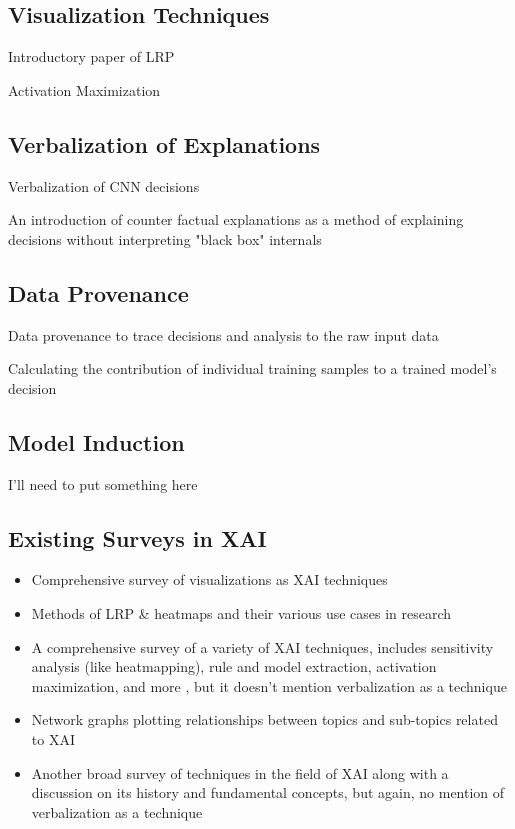 \documentclass{IEEEtran}
\begin{document}
\subsection{Visualization Techniques}

Introductory paper of LRP \cite{10.1371/journal.pone.0130140}

Activation Maximization \cite{Nguyen2016}

\subsection{Verbalization of Explanations}
Verbalization of CNN decisions \cite{10.1007/978-3-319-46493-0_1}

An introduction of counter factual explanations as a method of explaining decisions without interpreting "black box" internals \cite{DBLP:journals/corr/abs-1711-00399}

\subsection{Data Provenance}

Data provenance to trace decisions and analysis to the raw input data

Calculating the contribution of individual training samples to a trained model's decision \cite{Ma2017}

\subsection{Model Induction}

I'll need to put something here

\subsection{Existing Surveys in XAI}

\begin{itemize}
    \item Comprehensive survey of visualizations as XAI techniques \cite{Hohman2018}
    \item Methods of LRP \& heatmaps and their various use cases in research\cite{MONTAVON20181}
    \item A comprehensive survey of a variety of XAI techniques, includes sensitivity analysis (like heatmapping), rule and model extraction, activation maximization, and more \cite{Guidotti:2018:SME:3271482.3236009}, but it doesn't mention verbalization as a technique
    \item Network graphs plotting relationships between topics and sub-topics related to XAI \cite{Abdul:2018:TTE:3173574.3174156}
    \item Another broad survey of techniques in the field of XAI along with a discussion on its history and fundamental concepts, but again, no mention of verbalization as a technique\cite{Adadi2018}
\end{itemize}
\end{document}
